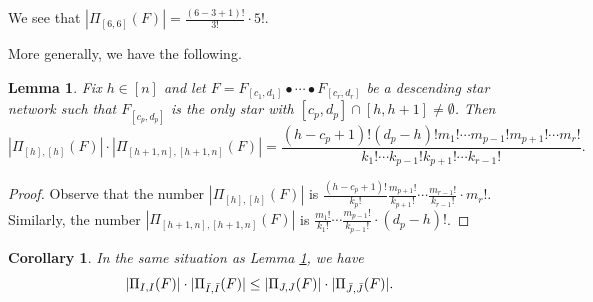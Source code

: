 \documentclass[12pt]{amsart}
\newtheorem{cor}[thm]{Corollary}
\newtheorem{lem}[thm]{Lemma}
\theoremstyle{definition}
\numberwithin{equation}{section}
\begin{document}
We see that $|\Pi_{[6,6]}(F)|=\frac{(6-3+1)!}{3!} \cdot 5!$.

More generally, we have the following.

\begin{lem}\label{eq:counting top-bots}
    Fix $h\in[n]$ and let $F=F_{[c_1,d_1]} \bullet \cdots \bullet F_{[c_r,d_r]}$ be a descending star network such that $F_{[c_p,d_p]}$ is the only star with $[c_p,d_p] \cap [h,h+1] \neq \emptyset$. Then
\begin{equation*}
        | \Pi_{[h],[h]}(F) | \cdot | \Pi_{[h+1,n],[h+1,n]}(F) | = \frac{(h-c_p+1)!(d_p-h)!m_1! \cdots m_{p-1}!m_{p+1}!\cdots m_r!}{k_1! \cdots k_{p-1}! k_{p+1}! \cdots k_{r-1}!}.
    \end{equation*}

\end{lem}

\begin{proof}
Observe that the number $|\Pi_{[h],[h]}(F)|$ is $\frac{(h-c_p+1)!}{k_p!}\frac{m_{p+1}!}{k_{p+1}!}\cdots\frac{m_{r-1}!}{k_{r-1}!} \cdot m_r!$.
Similarly, the number $|\Pi_{[h+1,n],[h+1,n]}(F)|$ is  $\frac{m_{1}!}{k_{1}!}\cdots\frac{m_{p-1}!}{k_{p-1}!} \cdot (d_p-h)!$.
\end{proof}

\begin{cor}\label{cor: ascending star network}
    In the same situation as Lemma \ref{eq:counting top-bots}, we have \begin{equation*}
        | \Pi_{I,I}(F)  | \cdot |\Pi_{\Bar{I},\Bar{I}}(F)| \leq | \Pi_{J,J}(F) | \cdot | \Pi_{\Bar{J},\Bar{J}}(F)  |.
    \end{equation*}
\end{cor}
\end{document}
